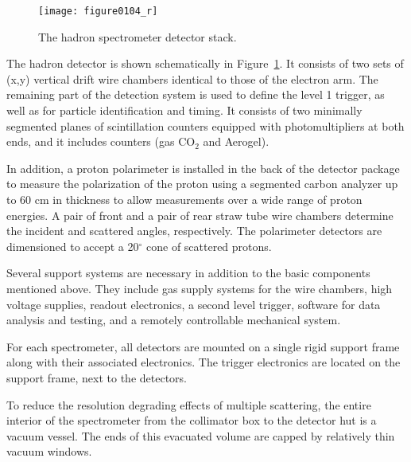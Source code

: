 {\begin{figure}[tbp]
\begin{center}
\texttt{[image: figure0104\_r]}
{\linespread{1.}
\caption[Spectrometers: Hadron Arm Detectors]{The hadron spectrometer detector stack.}
\label{fig:hrs_hadron_det}}
\end{center}
\end{figure}


The hadron detector is shown schematically in 
Figure~\ref{fig:hrs_hadron_det}.  It consists 
of two sets of (x,y) vertical drift wire chambers identical to those of the 
electron arm.  The remaining part of the detection system is used to 
define the level 1 trigger, as well as for particle identification and 
timing.  It consists of two minimally segmented planes of 
scintillation counters equipped with photomultipliers at both ends, and 
it includes \Cherenkov{} counters (gas CO$_2$ and Aerogel).

In addition, a proton polarimeter is installed in the back of the 
detector package to measure the polarization of the proton using a 
segmented carbon analyzer up to 60 cm in thickness to allow measurements 
over a wide range of proton energies.  A pair of front and a pair of 
rear straw tube wire chambers determine the incident and 
scattered angles, respectively.  The 
polarimeter detectors are dimensioned to accept a 20$^{\circ}$ cone of 
scattered protons.

Several support systems are necessary in addition to the basic 
components mentioned above.  They include gas supply systems for the 
wire chambers, high voltage supplies, readout electronics, a second 
level trigger, software for data analysis and testing, and a remotely 
controllable mechanical system.

For each spectrometer, all detectors are mounted on a 
single rigid support frame along with their associated electronics.  The trigger electronics are located on the support frame, next to the detectors.

To reduce the resolution degrading effects of multiple scattering, the 
entire interior of the spectrometer from the collimator box to the detector hut 
is a vacuum vessel.  The ends of this evacuated volume are capped by 
relatively thin vacuum windows.
}

